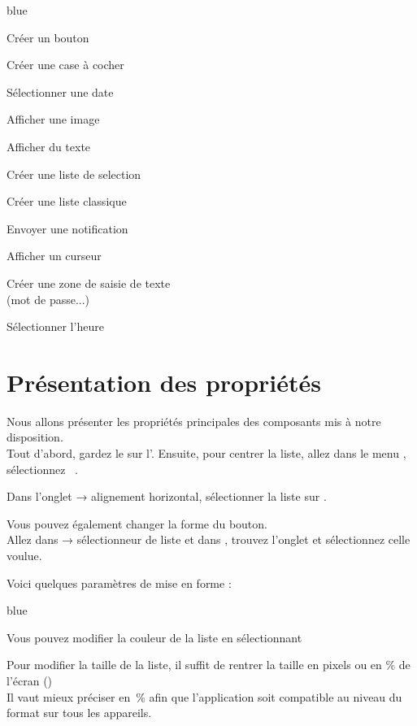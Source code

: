 \begin{items}{blue}{\Triangle}
    \item Créer un bouton
    \item Créer une case à cocher
    \item Sélectionner une date
    \item Afficher une image
    \item Afficher du texte
    \item Créer une liste de selection
    \item Créer une liste classique
    \item Envoyer une notification
    \item Afficher un curseur
    \item Créer une zone de saisie de texte \\(mot de passe...)
    \item Sélectionner l'heure
\end{items}



\section{Présentation des propriétés}

Nous allons présenter les propriétés principales des composants mis à notre disposition. \\
\noindent
Tout d'abord, gardez le  sur l'.
Ensuite, pour centrer la liste, allez dans le menu , sélectionnez  .

Dans l'onglet  → alignement horizontal, sélectionner la liste sur . 


Vous pouvez également changer la forme du bouton. \\
Allez dans  → sélectionneur de liste et dans , trouvez l'onglet  
et sélectionnez celle voulue.    



Voici quelques paramètres de mise en forme : 

\begin{items}{blue}{\Triangle}
    \item Vous pouvez modifier la couleur de la liste en sélectionnant 
    \item Pour modifier la taille de la liste, il suffit de rentrer la taille en pixels ou en \% de l'écran () \\	Il vaut mieux préciser en \% afin que l'application soit compatible au niveau du format sur tous les appareils.
\end{items}


